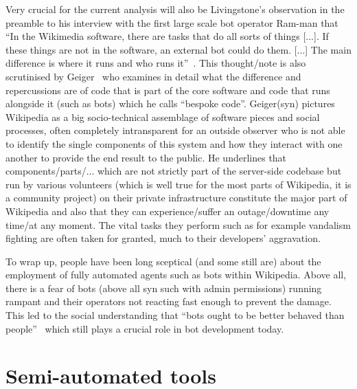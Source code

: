 Very crucial for the current analysis will also be Livingstone's observation in the preamble to his interview with the first large scale bot operator Ram-man that
``In the Wikimedia software, there are tasks that do all sorts of things [...].
If these things are not in the software, an external bot could do them. [...]
The main difference is where it runs and who runs it''~\cite{Livingstone2016}.
This thought/note is also scrutinised by Geiger~\cite{Geiger2014} who examines in detail what the difference and repercussions are of code that is part of the core software and code that runs alongside it (such as bots) which he calls ``bespoke code''.
Geiger(syn) pictures Wikipedia as a big socio-technical assemblage of software pieces and social processes, often completely intransparent for an outside observer who is not able to identify the single components of this system and how they interact with one another to provide the end result to the public.
He underlines that components/parts/... which are not strictly part of the server-side codebase but run by various volunteers (which is well true for the most parts of Wikipedia, it is a community project) on their private infrastructure constitute the major part of Wikipedia and also that they can experience/suffer an outage/downtime any time/at any moment.
The vital tasks they perform such as for example vandalism fighting are often taken for granted, much to their developers' aggravation.

To wrap up, people have been long sceptical (and some still are) about the employment of fully automated agents such as bots within Wikipedia. %
Above all, there is a fear of bots (above all syn such with admin permissions) running rampant and their operators not reacting fast enough to prevent the damage.
This led to the social understanding that ``bots ought to be better behaved than people''~\cite{Geiger2011} which still plays a crucial role in bot development today.


\section{Semi-automated tools}


